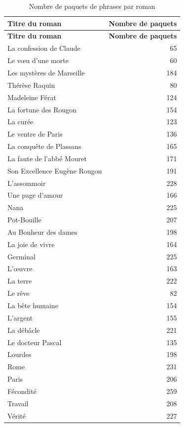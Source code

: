 \documentclass{article}
\begin{document}
\begin{longtable}{p{8cm}r}
\caption{Nombre de paquets de phrases par roman} \\
\toprule
\textbf{Titre du roman} & \textbf{Nombre de paquets} \\
\midrule
\endfirsthead

\toprule
\textbf{Titre du roman} & \textbf{Nombre de paquets} \\
\midrule
\endhead

La confession de Claude & 65 \\
Le vœu d'une morte & 60 \\
Les mystères de Marseille & 184 \\
Thérèse Raquin & 80 \\
Madeleine Férat & 124 \\
La fortune des Rougon & 154 \\
La curée & 123 \\
Le ventre de Paris & 136 \\
La conquête de Plassans & 165 \\
La faute de l'abbé Mouret & 171 \\
Son Excellence Eugène Rougon & 191 \\
L'assommoir & 228 \\
Une page d'amour & 166 \\
Nana & 225 \\
Pot-Bouille & 207 \\
Au Bonheur des dames & 198 \\
La joie de vivre & 164 \\
Germinal & 225 \\
L'œuvre & 163 \\
La terre & 222 \\
Le rêve & 82 \\
La bête humaine & 154 \\
L'argent & 155 \\
La débâcle & 221 \\
Le docteur Pascal & 135 \\
Lourdes & 198 \\
Rome & 231 \\
Paris & 206 \\
Fécondité & 259 \\
Travail & 208 \\
Vérité & 227 \\

\bottomrule
\end{longtable}
\end{document}
